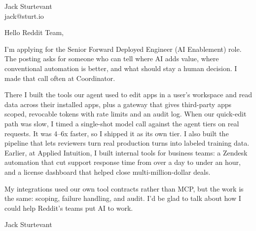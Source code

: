 \documentclass[11pt]{article}
\begin{document}
\raggedright

{\namefont\fontsize{20pt}{24pt}\selectfont Jack Sturtevant}\\[-0.3em]
jack@sturt.io

\vspace{1.2em}

Hello Reddit Team,

I'm applying for the Senior Forward Deployed Engineer (AI Enablement) role. The posting asks for someone who can tell where AI adds value, where conventional automation is better, and what should stay a human decision. I made that call often at Coordinator.

There I built the tools our agent used to edit apps in a user's workspace and read data across their installed apps, plus a gateway that gives third-party apps scoped, revocable tokens with rate limits and an audit log. When our quick-edit path was slow, I timed a single-shot model call against the agent tiers on real requests. It was 4--6x faster, so I shipped it as its own tier. I also built the pipeline that lets reviewers turn real production turns into labeled training data. Earlier, at Applied Intuition, I built internal tools for business teams: a Zendesk automation that cut support response time from over a day to under an hour, and a license dashboard that helped close multi-million-dollar deals.

My integrations used our own tool contracts rather than MCP, but the work is the same: scoping, failure handling, and audit. I'd be glad to talk about how I could help Reddit's teams put AI to work.

\vspace{0.6em}
Jack Sturtevant
\end{document}
